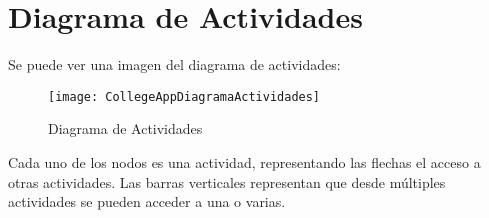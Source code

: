%
%
%
%

\cleardoublepage
\chapter{Diagrama de Actividades}
\label{chap:activitiesdiagram}

Se puede ver una imagen del diagrama de actividades:

\begin{figure}[h]
	\centering
	\texttt{[image: CollegeAppDiagramaActividades]}
	\caption{Diagrama de Actividades}
	\label{fig:ActivitiesDiagram}
\end{figure}

Cada uno de los nodos es una actividad, representando las flechas el acceso a otras actividades. Las barras verticales representan que desde múltiples actividades se pueden acceder a una o varias.